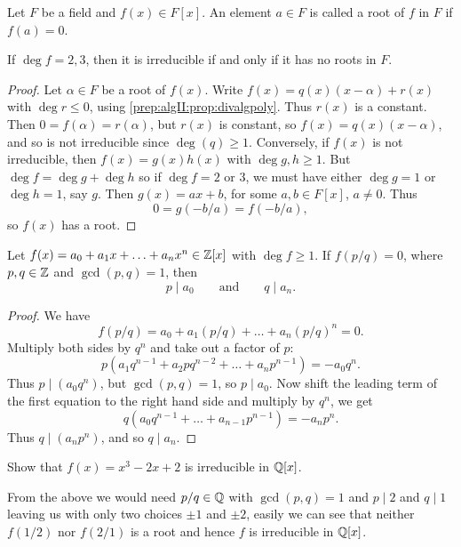 \documentclass[10pt, a4paper]{article}
\begin{document}
Let $F$ be a field and $f(x) \in F[x]$.
An element $a \in F$ is called a root of $f$ in $F$ if $f(a) = 0$.

If $\deg{f} = 2, 3$,
then it is irreducible if and only if it has no roots in $F$.
\begin{proof}
    Let $\alpha \in F$ be a root of $f(x)$.
    Write $f(x) = q(x)(x - \alpha) + r(x)$ with $\deg{r} \leq 0$,
    using \autoref{prep:algII:prop:divalgpoly}.
    Thus $r(x)$ is a constant.
    Then $0 = f(\alpha) = r(\alpha)$,
    but $r(x)$ is constant,
    so $f(x) = q(x)(x - \alpha)$,
    and so is not irreducible since $\deg(q) \geq 1$.
    Conversely,
    if $f(x)$ is not irreducible,
    then $f(x) = g(x)h(x)$ with $\deg{g}, h \geq 1$.
    But $\deg{f} = \deg{g} + \deg{h}$ so if $\deg{f} = 2$ or $3$,
    we must have either $\deg{g} = 1$ or $\deg{h} = 1$,
    say $g$.
    Then $g(x) = ax + b$,
    for some $a, b \in F[x]$,
    $a \neq 0$.
    Thus
    \[
    0 = g(-b / a) = f(-b / a),
    \]
    so $f(x)$ has a root.
\end{proof}

\begin{proposition}
    Let $f(x) = a_0 + a_1x + \dotsc + a_nx ^ n \in \mathbb{Z}[x]$ with $\deg{f} \geq 1$.
    If $f(p / q) = 0$,
    where $p, q \in \mathbb{Z}$ and $\gcd(p, q) = 1$,
    then
    \[
    p \mid a_0 \qquad\text{and}\qquad q \mid a_n.
    \]

    \begin{proof}
        We have
        \[
        f(p / q) = a_0 + a_1(p / q) + \dotsc + a_n(p / q) ^ n = 0.
        \]
        Multiply both sides by $q ^ n$ and take out a factor of $p$:
        \[
        p(a_1q ^ {n - 1} + a_2pq ^ {n - 2} + \dotsc + a_np ^ {n - 1}) = -a_0q ^ n.
        \]
        Thus $p \mid (a_0q ^ n)$,
        but $\gcd(p, q) = 1$,
        so $p \mid a_0$.
        Now shift the leading term of the first equation to the right hand side and multiply by $q ^ n$,
        we get
        \[
        q(a_0q ^ {n - 1} + \dotsc + a_{n - 1}p ^ {n - 1}) = -a_np ^ n.
        \]
        Thus $q \mid (a_np ^ n)$,
        and so $q \mid a_n$.
    \end{proof}
\end{proposition}

\begin{example}
    Show that $f(x) = x ^ 3 - 2x + 2$ is irreducible in $\mathbb{Q}[x]$.

    \begin{solution}
        From the above we would need $p / q \in \mathbb{Q}$ with $\gcd(p, q) = 1$ and $p \mid 2$ and $q \mid 1$ leaving us with only two choices $\pm 1$ and $\pm 2$,
        easily we can see that neither $f(1 / 2)$ nor $f(2 / 1)$ is a root and hence $f$ is irreducible in $\mathbb{Q}[x]$.
    \end{solution}
\end{example}
\end{document}

